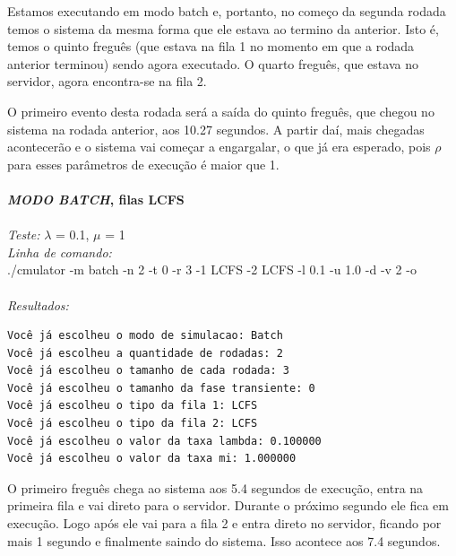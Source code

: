 \documentclass[a4paper,10pt]{article}
\begin{document}
    Estamos executando em modo batch e, portanto, no começo da segunda rodada temos o sistema da mesma forma que ele estava ao termino da anterior. Isto é, temos o quinto freguês (que estava na fila 1 no momento em que a rodada anterior terminou) sendo agora executado. O quarto freguês, que estava no servidor, agora encontra-se na fila 2.

    O primeiro evento desta rodada será a saída do quinto freguês, que chegou no sistema na rodada anterior, aos 10.27 segundos. A partir daí, mais chegadas acontecerão e o sistema vai começar a engargalar, o que já era esperado, pois $\rho$ para esses parâmetros de execução é maior que 1.
\\
\\
\textbf{\emph{MODO BATCH}, filas LCFS}
\\
\\
\emph{Teste:} $\lambda$ = 0.1, $\mu$ = 1
\\
\emph{Linha de comando:}
\\
./cmulator -m batch -n 2 -t 0 -r 3 -1 LCFS -2 LCFS -l 0.1 -u 1.0 -d -v 2 -o
\\
\\
\emph{Resultados:}
\\\begin{verbatim}
Você já escolheu o modo de simulacao: Batch
Você já escolheu a quantidade de rodadas: 2
Você já escolheu o tamanho de cada rodada: 3
Você já escolheu o tamanho da fase transiente: 0
Você já escolheu o tipo da fila 1: LCFS
Você já escolheu o tipo da fila 2: LCFS
Você já escolheu o valor da taxa lambda: 0.100000
Você já escolheu o valor da taxa mi: 1.000000
\end{verbatim}
    O primeiro freguês chega ao sistema aos 5.4 segundos de execução, entra na primeira fila e vai direto para o servidor. Durante o próximo segundo ele fica em execução. Logo após ele vai para a fila 2 e entra direto no servidor, ficando por mais 1 segundo e finalmente saindo do sistema. Isso acontece aos 7.4 segundos.
\end{document}
